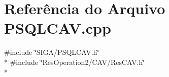 \section{Referência do Arquivo P\+S\+Q\+L\+C\+A\+V.\+cpp}
\label{_p_s_q_l_c_a_v_8cpp}
{\ttfamily \#include \char`\"{}S\+I\+G\+A/\+P\+S\+Q\+L\+C\+A\+V.\+h\char`\"{}}\\*
{\ttfamily \#include \char`\"{}Res\+Operation2/\+C\+A\+V/\+Res\+C\+A\+V.\+h\char`\"{}}\\*
